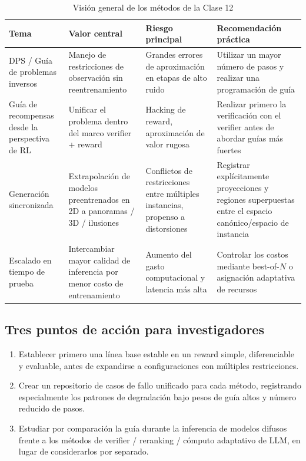 \begin{table}[H]
\centering
\begin{tabular}{p{} p{} p{} p{}}
\toprule
Tema & Valor central & Riesgo principal & Recomendación práctica \\
\midrule
DPS / Guía de problemas inversos & Manejo de restricciones de observación sin reentrenamiento & Grandes errores de aproximación en etapas de alto ruido & Utilizar un mayor número de pasos y realizar una programación de guía \\
Guía de recompensas desde la perspectiva de RL & Unificar el problema dentro del marco verifier + reward & Hacking de reward, aproximación de valor rugosa & Realizar primero la verificación con el verifier antes de abordar guías más fuertes \\
Generación sincronizada & Extrapolación de modelos preentrenados en 2D a panoramas / 3D / ilusiones & Conflictos de restricciones entre múltiples instancias, propenso a distorsiones & Registrar explícitamente proyecciones y regiones superpuestas entre el espacio canónico/espacio de instancia \\
Escalado en tiempo de prueba & Intercambiar mayor calidad de inferencia por menor costo de entrenamiento & Aumento del gasto computacional y latencia más alta & Controlar los costos mediante best-of-$N$ o asignación adaptativa de recursos \\
\bottomrule
\end{tabular}
\caption{Visión general de los métodos de la Clase 12}
\end{table}

\subsection{Tres puntos de acción para investigadores}

\begin{enumerate}
    \item Establecer primero una línea base estable en un reward simple, diferenciable y evaluable, antes de expandirse a configuraciones con múltiples restricciones.
    \item Crear un repositorio de casos de fallo unificado para cada método, registrando especialmente los patrones de degradación bajo pesos de guía altos y número reducido de pasos.
    \item Estudiar por comparación la guía durante la inferencia de modelos difusos frente a los métodos de verifier / reranking / cómputo adaptativo de LLM, en lugar de considerarlos por separado.
\end{enumerate}

